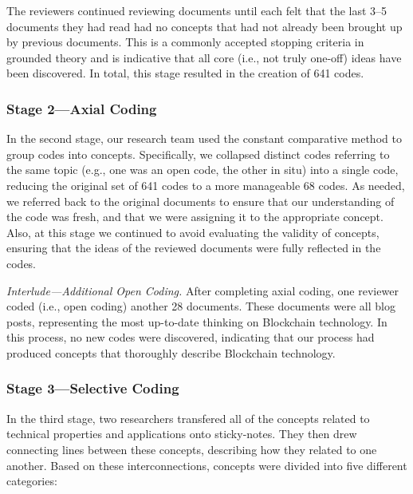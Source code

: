 The reviewers continued reviewing documents until each felt that the last 3--5 documents they had read had no concepts that had not already been brought up by previous documents.
This is a commonly accepted stopping criteria in grounded theory and is indicative that all core (i.e., not truly one-off) ideas have been discovered.
In total, this stage resulted in the creation of 641 codes.

\subsubsection{Stage 2---Axial Coding}
In the second stage, our research team used the constant comparative method to group codes into concepts.
Specifically, we collapsed distinct codes referring to the same topic (e.g., one was an open code, the other in situ) into a single code, reducing the original set of 641 codes to a more manageable 68 codes.
As needed, we referred back to the original documents to ensure that our understanding of the code was fresh, and that we were assigning it to the appropriate concept.
Also, at this stage we continued to avoid evaluating the validity of concepts, ensuring that the ideas of the reviewed documents were fully reflected in the codes.

\textit{Interlude---Additional Open Coding.}
After completing axial coding, one reviewer coded (i.e., open coding) another 28 documents.
These documents were all blog posts, representing the most up-to-date thinking on Blockchain technology.
In this process, no new codes were discovered, indicating that our process had produced concepts that thoroughly describe Blockchain technology.

\subsubsection{Stage 3---Selective Coding}
In the third stage, two researchers transfered all of the concepts related to technical properties and applications onto sticky-notes.
They then drew connecting lines between these concepts, describing how they related to one another.
Based on these interconnections, concepts were divided into five different categories:


